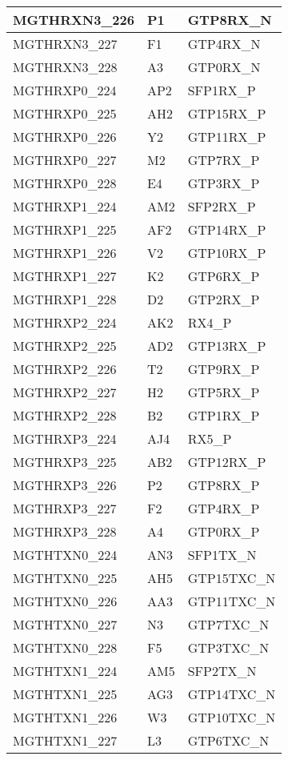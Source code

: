 \begin{footnotesize}
\begin{longtable}{|p{7cm}|p{1cm}|p{5cm}|}
MGTHRXN3\_226	&	P1	&	GTP8RX\_N	\\ \hline
MGTHRXN3\_227	&	F1	&	GTP4RX\_N	\\ \hline
MGTHRXN3\_228	&	A3	&	GTP0RX\_N	\\ \hline
MGTHRXP0\_224	&	AP2	&	SFP1RX\_P	\\ \hline
MGTHRXP0\_225	&	AH2	&	GTP15RX\_P	\\ \hline
MGTHRXP0\_226	&	Y2	&	GTP11RX\_P	\\ \hline
MGTHRXP0\_227	&	M2	&	GTP7RX\_P	\\ \hline
MGTHRXP0\_228	&	E4	&	GTP3RX\_P	\\ \hline
MGTHRXP1\_224	&	AM2	&	SFP2RX\_P	\\ \hline
MGTHRXP1\_225	&	AF2	&	GTP14RX\_P	\\ \hline
MGTHRXP1\_226	&	V2	&	GTP10RX\_P	\\ \hline
MGTHRXP1\_227	&	K2	&	GTP6RX\_P	\\ \hline
MGTHRXP1\_228	&	D2	&	GTP2RX\_P	\\ \hline
MGTHRXP2\_224	&	AK2	&	RX4\_P	\\ \hline
MGTHRXP2\_225	&	AD2	&	GTP13RX\_P	\\ \hline
MGTHRXP2\_226	&	T2	&	GTP9RX\_P	\\ \hline
MGTHRXP2\_227	&	H2	&	GTP5RX\_P	\\ \hline
MGTHRXP2\_228	&	B2	&	GTP1RX\_P	\\ \hline
MGTHRXP3\_224	&	AJ4	&	RX5\_P	\\ \hline
MGTHRXP3\_225	&	AB2	&	GTP12RX\_P	\\ \hline
MGTHRXP3\_226	&	P2	&	GTP8RX\_P	\\ \hline
MGTHRXP3\_227	&	F2	&	GTP4RX\_P	\\ \hline
MGTHRXP3\_228	&	A4	&	GTP0RX\_P	\\ \hline
MGTHTXN0\_224	&	AN3	&	SFP1TX\_N	\\ \hline
MGTHTXN0\_225	&	AH5	&	GTP15TXC\_N	\\ \hline
MGTHTXN0\_226	&	AA3	&	GTP11TXC\_N	\\ \hline
MGTHTXN0\_227	&	N3	&	GTP7TXC\_N	\\ \hline
MGTHTXN0\_228	&	F5	&	GTP3TXC\_N	\\ \hline
MGTHTXN1\_224	&	AM5	&	SFP2TX\_N	\\ \hline
MGTHTXN1\_225	&	AG3	&	GTP14TXC\_N	\\ \hline
MGTHTXN1\_226	&	W3	&	GTP10TXC\_N	\\ \hline
MGTHTXN1\_227	&	L3	&	GTP6TXC\_N	\\ \hline

\end{longtable}
\end{footnotesize}
